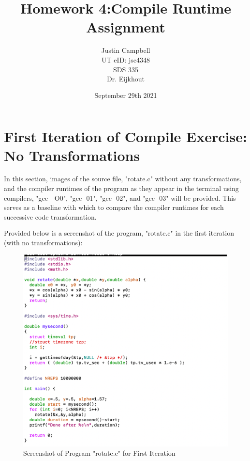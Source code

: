 \documentclass{article}
\begin{document}
\title{Homework 4:Compile Runtime Assignment}
\author{Justin Campbell \\
UT eID: jsc4348 \\
SDS 335 \\
Dr. Eijkhout}
\date{September 29th 2021}
\maketitle


\section{First Iteration of Compile Exercise: No Transformations}

In this section, images of the source file, "rotate.c" without any transformations, and the compiler runtimes of the program as they appear in the terminal using compilers, "gcc - O0", "gcc -01", "gcc -02", and "gcc -03" will be provided. This serves as a baseline with which to compare the compiler runtimes for each successive code transformation.

Provided below is a screenshot of the program, "rotate.c" in the first iteration (with no transformations):


\begin{figure}[ht]
    \centering
\includegraphics[scale=0.20]{graphics_hw4/rotate_c_first_iteration.png}
    \caption{Screenshot of Program "rotate.c" for First Iteration}
    \label{fig:my_label}
\end{figure}
\pagebreak
\end{document}
